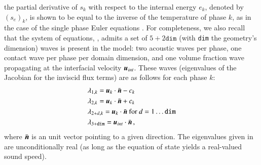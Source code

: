 \documentclass[preprint,10pt]{elsarticle}
\begin{document}
the partial derivative of $s_k$ with respect to the internal energy $e_k$, denoted by $(s_e)_k$, is shown to be equal to the inverse of the temperature 
of phase $k$, as in the case of the single phase Euler equations \cite{jlg, Marco_dissertation}. For completeness, we also recall that the system of equations, , admits a set of $5+2\texttt{dim}$ (with \texttt{dim} the geometry's dimension) waves 
is present in the model: two acoustic waves per phase, one contact wave per phase per domain dimension, and one volume fraction wave propagating 
at the interfacial velocity $\boldsymbol u_{int}$. These waves (eigenvalues of the Jacobian for the inviscid flux terms) are as follows for each phase $k$:
% 
\begin{align}\label{eq:eigenvalues}
&\lambda_{1,k} = \boldsymbol u_k \cdot \bar{\boldsymbol n} - c_k \nonumber\\
&\lambda_{2,k} = \boldsymbol u_k \cdot \bar{\boldsymbol n} + c_k \nonumber\\
&\lambda_{2+d,k} = \boldsymbol u_k \cdot \bar{\boldsymbol n} \text{ for } d = 1 \dots \texttt{dim} \\
&\lambda_{3+\texttt{dim}} = \boldsymbol u_{int} \cdot \bar{\boldsymbol n} \nonumber \,,
\end{align}
%
where $\bar{\boldsymbol n}$ is an unit vector pointing to a given direction. The eigenvalues given in  are unconditionally 
real (as long as the equation of state yields a real-valued sound speed).
\end{document}
